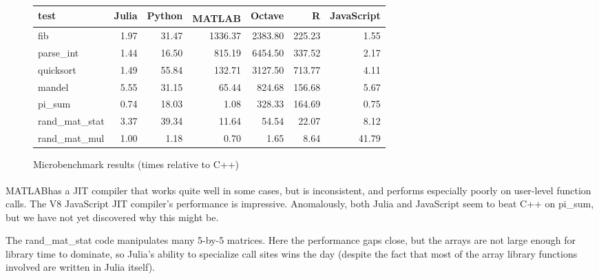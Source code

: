 \documentclass[9pt]{sigplanconf}
\newcommand{\Matlab}{MATLAB\textsuperscript{\tiny\textregistered}}
\begin{document}
\begin{figure*}
\caption{Microbenchmark results (times relative to C++)}
\label{mbr}
\begin{center}

\begin{tabular}{|l|r|r|r|r|r|r|}\hline
test & Julia & Python & \Matlab & Octave & R & JavaScript \\
\hline \hline
fib        & 1.97 & 31.47 & 1336.37  & 2383.80 & 225.23 & 1.55 \\
\hline
parse\_int & 1.44 & 16.50 &  815.19  & 6454.50 & 337.52 & 2.17 \\
\hline
quicksort  & 1.49 & 55.84 &  132.71  & 3127.50 & 713.77 & 4.11 \\
\hline
mandel     & 5.55 & 31.15 &   65.44  &  824.68 & 156.68 & 5.67 \\
\hline
pi\_sum    & 0.74 & 18.03 &    1.08  &  328.33 & 164.69 & 0.75 \\
\hline
rand\_mat\_stat & 3.37 & 39.34 & 11.64 & 54.54 &  22.07 & 8.12 \\
\hline
rand\_mat\_mul  & 1.00 &  1.18 &  0.70 &  1.65 &   8.64 & 41.79 \\
\hline
\end{tabular}



\end{center}
\end{figure*}


\Matlab has a JIT compiler
that works quite well in some cases, but is inconsistent, and
performs especially poorly on user-level function calls. The V8
JavaScript JIT compiler's performance is impressive. Anomalously, both
Julia and JavaScript seem to beat C++ on pi\_sum, but we have not yet
discovered why this might be.

The rand\_mat\_stat code manipulates many 5-by-5 matrices. Here the
performance gaps close, but the arrays are not large enough for
library time to dominate, so Julia's ability to specialize call sites
wins the day (despite the fact that most of the array library functions
involved are written in Julia itself).
\end{document}
